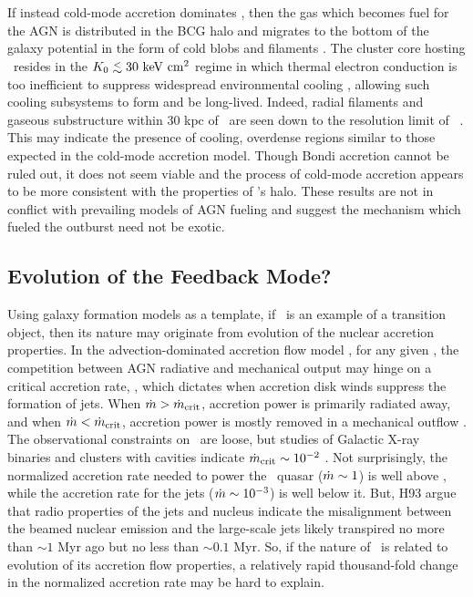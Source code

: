 \documentclass[useAMS,usenatbib]{mn2e}
\begin{document}
If instead cold-mode accretion dominates \citep{pizzolato05}, then the
gas which becomes fuel for the AGN is distributed in the BCG halo and
migrates to the bottom of the galaxy potential in the form of cold
blobs and filaments \citep{2010MNRAS.408..961P}. The cluster core
hosting \irs\ resides in the $\kna \la 30 ~\ent$ regime in which
thermal electron conduction is too inefficient to suppress widespread
environmental cooling \citep{conduction}, allowing such cooling
subsystems to form and be long-lived. Indeed, radial filaments and
gaseous substructure within 30 kpc of \irs\ are seen down to the
resolution limit of \hst\ \citep{1999Ap&SS.266..113A}. This may
indicate the presence of cooling, overdense regions similar to those
expected in the cold-mode accretion model. Though Bondi accretion
cannot be ruled out, it does not seem viable and the process of
cold-mode accretion appears to be more consistent with the properties
of \irs's halo. These results are not in conflict with prevailing
models of AGN fueling and suggest the mechanism which fueled the
outburst need not be exotic.

\subsection{Evolution of the Feedback Mode?}

Using galaxy formation models as a template, if \irs\ is an example of
a transition object, then its nature may originate from evolution of
the nuclear accretion properties. In the advection-dominated accretion
flow model \citep{adaf}, for any given \mbh, the competition between
AGN radiative and mechanical output may hinge on a critical accretion
rate, \dmcrit, which dictates when accretion disk winds suppress the
formation of jets. When $\dot{m} > \dot{m}_{\rm{crit}}$, accretion power is
primarily radiated away, and when $\dot{m} < \dot{m}_{\rm{crit}}$, accretion power
is mostly removed in a mechanical outflow
\citep{1997ApJ...489..865E}. The observational constraints on
\dmcrit\ are loose, but studies of Galactic X-ray binaries and
clusters with cavities indicate $\dot{m}_{\rm{crit}} \sim 10^{-2}$
\citep[\eg][]{2003MNRAS.344...60G, 2008NewAR..51..733N, minaspin}. Not
surprisingly, the normalized accretion rate needed to power the
\irs\ quasar ($\dot{m} \sim 1$) is well above \dmcrit, while the
accretion rate for the jets ($\dot{m} \sim 10^{-3}$) is well below
it. But, H93 argue that radio properties of the jets and nucleus
indicate the misalignment between the beamed nuclear emission and the
large-scale jets likely transpired no more than $\sim 1$ Myr ago but
no less than $\sim 0.1$ Myr. So, if the nature of \irs\ is related to
evolution of its accretion flow properties, a relatively rapid
thousand-fold change in the normalized accretion rate may be hard to
explain.
\end{document}
